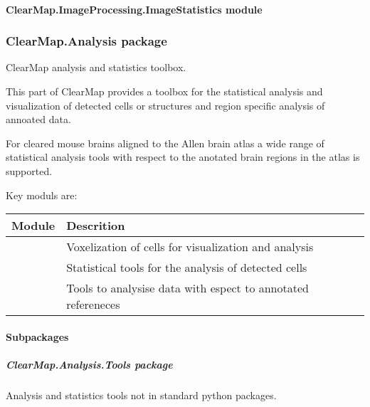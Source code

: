 \documentclass[letterpaper,10pt,english]{sphinxmanual}
\begin{document}
\paragraph{ClearMap.ImageProcessing.ImageStatistics module}
\label{api/ClearMap.ImageProcessing:clearmap-imageprocessing-imagestatistics-module}

\subsubsection{ClearMap.Analysis package}
\label{api/ClearMap.Analysis:clearmap-analysis-package}\label{api/ClearMap.Analysis::doc}\label{api/ClearMap.Analysis:module-ClearMap.Analysis}
ClearMap analysis and statistics toolbox.

This part of ClearMap provides a toolbox for the statistical analysis and
visualization of detected cells or structures and region specific analysis
of annoated data.

For cleared mouse brains aligned to the Allen brain atlas a wide range of
statistical analysis tools with respect to the anotated brain regions in
the atlas is supported.

Key moduls are:

\begin{tabulary}{\linewidth}{|L|L|}
\hline
\textsf{\relax 
Module
} & \textsf{\relax 
Descrition
}\\
\hline
{\hyperref[api/ClearMap.Analysis:module-ClearMap.Analysis.Voxelization]{\emph{}}}
 & 
Voxelization of cells for visualization and analysis
\\
\hline
{\hyperref[api/ClearMap.Analysis:module-ClearMap.Analysis.Statistics]{\emph{}}}
 & 
Statistical tools for the analysis of detected cells
\\
\hline
{\hyperref[api/ClearMap.Analysis:module-ClearMap.Analysis.Label]{\emph{}}}
 & 
Tools to analysise data with espect to annotated refereneces
\\
\hline\end{tabulary}



\paragraph{Subpackages}
\label{api/ClearMap.Analysis:subpackages}

\subparagraph{ClearMap.Analysis.Tools package}
\label{api/ClearMap.Analysis.Tools:clearmap-analysis-tools-package}\label{api/ClearMap.Analysis.Tools:module-ClearMap.Analysis.Tools}\label{api/ClearMap.Analysis.Tools::doc}
Analysis and statistics tools not in standard python packages.
\end{document}
